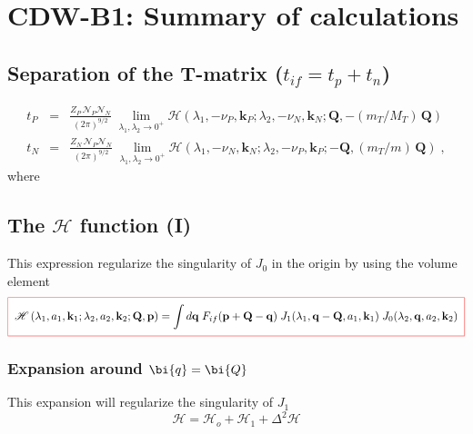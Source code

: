 \chapter{CDW-B1: Summary of calculations}

\section*[{Separation of the T-matrix}]{Separation of the T-matrix ($t_{if} = t_{p} + t_{n}$)}

\begin{eqnarray}\label{QR:T}%
t_{P} &=& \frac{Z_{P}\, \mathcal{N}_{P} \mathcal{N}_{N}}{(2\pi)^{9/2}}
\; \lim_{\lambda_{1},\lambda_{2} \to 0^{+}} \mathcal{H} \left(
\lambda_{1},- \nu_{P},\bm{k}_{P} ;  \lambda_{2},-
\nu_{N},\bm{k}_{N};\bm{Q} , -(m_{T}/M_{T}) \, \bm{Q} \right)
  \nonumber \\
t_{N} &=& \frac{Z_{N} \, \mathcal{N}_{P} \mathcal{N}_{N}}{(2\pi)^{9/2}}
\; \lim_{\lambda_{1},\lambda_{2} \to 0^{+}} \mathcal{H} \left(
\lambda_{1}, - \nu_{N},\bm{k}_{N} ; \lambda_{2},- \nu_{P},\bm{k}_{P} ;
- \bm{Q} ,  (m_{T}/m) \, \bm{Q} \right) \; ,
\end{eqnarray}
%
where
%
\section{The $\mathcal{H}$ function (I)}
This expression regularize the singularity of $J_{0}$ in the origin by
using the volume element
%
\begin{equation}\label{Q:Ha}%
  \fbeq{
 \mathcal{H} \left( \lambda_{1},a_{1},\bm{k}_{1} ;
  \lambda_{2},a_{2},\bm{k}_{2}; \bm{Q}, \bm{p} \right)  =
 \int d \bm{q} \; F_{if}( \bm{p} + \bm{Q} - \bm{q} ) \;
 J_{1}( \lambda_{1}, \bm{q} - \bm{Q}, a_{1}, \bm{k}_{1} )\;
J_{0}( \lambda_{2}, \bm{q} , a_{2}, \bm{k}_{2} )
  }
\end{equation}

\subsection{Expansion around $\bi{q} = \bi{Q}$} 

This expansion will regularize the singularity of $J_{1}$
%
\[
\mathcal{H} = \mathcal{H}_{o} + \mathcal{H}_{1} + \Delta^{2}
\mathcal{H}
\]

